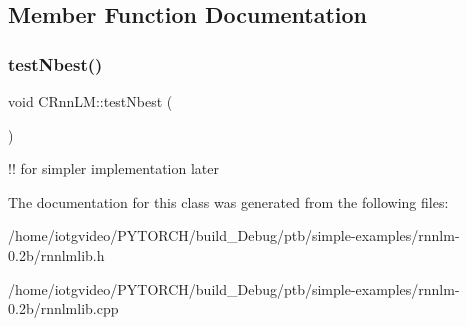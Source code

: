 \subsection{Member Function Documentation}
\mbox{\label{class_c_rnn_l_m_aa2625f24a2ac406eba4e38a57755097e}} 
\subsubsection{\texorpdfstring{test\+Nbest()}{testNbest()}}
{\footnotesize\ttfamily void C\+Rnn\+L\+M\+::test\+Nbest (\begin{DoxyParamCaption}{ }\end{DoxyParamCaption})}

!! for simpler implementation later 

The documentation for this class was generated from the following files\+:\begin{DoxyCompactItemize}
\item 
/home/iotgvideo/\+P\+Y\+T\+O\+R\+C\+H/build\+\_\+\+Debug/ptb/simple-\/examples/rnnlm-\/0.\+2b/rnnlmlib.\+h\item 
/home/iotgvideo/\+P\+Y\+T\+O\+R\+C\+H/build\+\_\+\+Debug/ptb/simple-\/examples/rnnlm-\/0.\+2b/rnnlmlib.\+cpp\end{DoxyCompactItemize}

